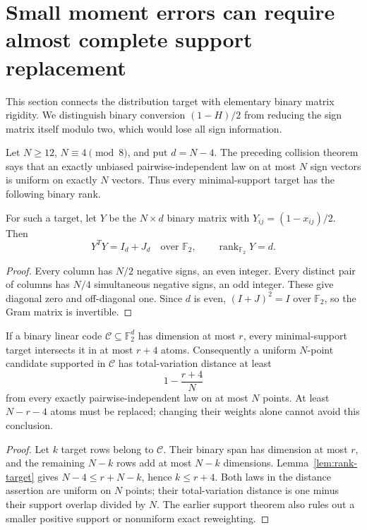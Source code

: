 \section{Small moment errors can require almost complete support replacement}
\label{sec:rank-rounding}
This section connects the distribution target with elementary binary
matrix rigidity. We distinguish binary conversion $(1-H)/2$ from
reducing the sign matrix itself modulo two, which would lose all
sign information.

Let $N\ge12$, $N\equiv4\pmod8$, and put $d=N-4$. The preceding
collision theorem says that an exactly unbiased pairwise-independent
law on at most $N$ sign vectors is uniform on exactly $N$ vectors.
Thus every minimal-support target has the following binary rank.

\begin{lemma}
\label{lem:rank-target}
For such a target, let $Y$ be the $N\times d$ binary matrix with
$Y_{ij}=(1-x_{ij})/2$. Then
\[
 Y^TY=I_d+J_d\quad\text{over }\mathbb F_2,
 \qquad \operatorname{rank}_{\mathbb F_2}Y=d.
\]
\end{lemma}
\begin{proof}
Every column has $N/2$ negative signs, an even integer. Every distinct
pair of columns has $N/4$ simultaneous negative signs, an odd integer.
These give diagonal zero and off-diagonal one. Since $d$ is even,
$(I+J)^2=I$ over $\mathbb F_2$, so the Gram matrix is invertible.
\end{proof}

\begin{theorem}\label{thm:rank-overlap}
If a binary linear code $\mathcal C\subseteq\mathbb F_2^d$ has
dimension at most $r$, every minimal-support target intersects it in
at most $r+4$ atoms. Consequently a uniform $N$-point candidate
supported in $\mathcal C$ has total-variation distance at least
\[
 1-\frac{r+4}{N}
\]
from every exactly pairwise-independent law on at most $N$ points.
At least $N-r-4$ atoms must be replaced; changing their weights alone
cannot avoid this conclusion.
\end{theorem}
\begin{proof}
Let $k$ target rows belong to $\mathcal C$. Their binary span has
dimension at most $r$, and the remaining $N-k$ rows add at most
$N-k$ dimensions. Lemma~\ref{lem:rank-target} gives
$N-4\le r+N-k$, hence $k\le r+4$.
Both laws in the distance assertion are uniform on $N$ points;
their total-variation distance is one minus their support overlap
divided by $N$. The earlier support theorem also rules out a smaller
positive support or nonuniform exact reweighting.
\end{proof}

